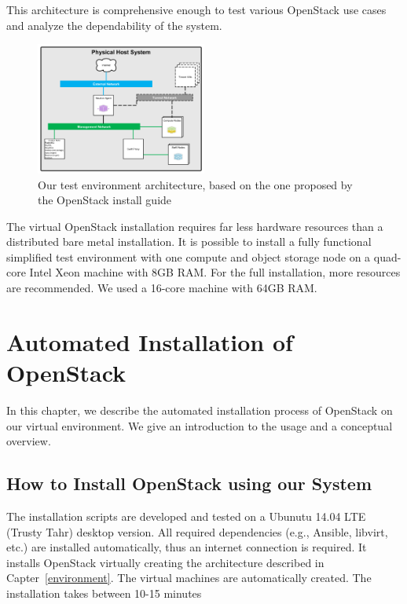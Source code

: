 \documentclass[conference]{IEEEtran}
\begin{document}
This architecture is comprehensive enough to test various OpenStack use cases and analyze the dependability of the system.

\begin{figure}[h]
	\centering
		\includegraphics[width=0.50\textwidth]{images/architectureEN.PNG}
	\caption{Our test environment architecture, based on the one proposed by the OpenStack install guide}
	\label{fig:arch}
\end{figure}

The virtual OpenStack installation requires far less hardware resources than a distributed bare metal installation. It is possible to install a fully functional simplified test environment with one compute and object storage node on a quad-core Intel Xeon machine with 8GB RAM. For the full installation, more resources are recommended. We used a 16-core machine with 64GB RAM. 

\section{Automated Installation of OpenStack}
\label{installing}

In this chapter, we describe the automated installation process of OpenStack on our virtual environment. We give an introduction to the usage and a conceptual overview.

\subsection{How to Install OpenStack using our System}
The installation scripts are developed and tested on a Ubunutu 14.04 LTE (Trusty Tahr) desktop version. All required dependencies (e.g., Ansible, libvirt, etc.) are installed automatically, thus an internet connection is required. It installs OpenStack virtually creating the architecture described in Capter~\ref{environment}. The virtual machines are automatically created. The installation takes between 10-15 minutes
\end{document}
